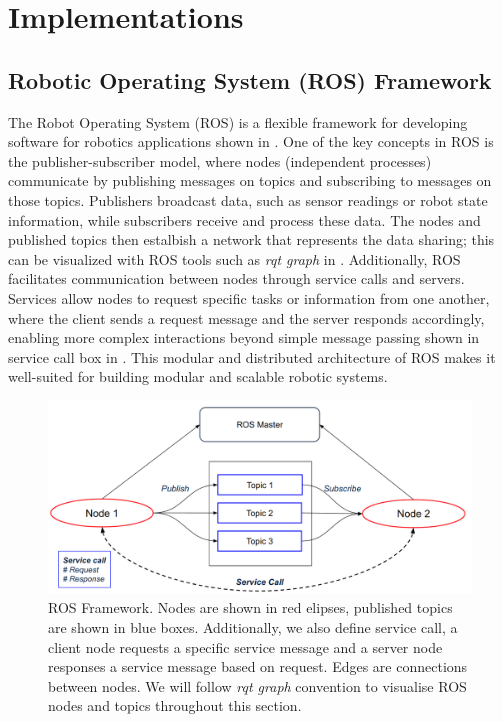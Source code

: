 \section{Implementations}
\label{sec:implementation}
\subsection{Robotic Operating System (ROS) Framework}
The Robot Operating System (ROS) is a flexible framework for developing software for robotics applications shown in . One of the key concepts in ROS is the publisher-subscriber model, where nodes (independent processes) communicate by publishing messages on topics and subscribing to messages on those topics. Publishers broadcast data, such as sensor readings or robot state information, while subscribers receive and process these data. The nodes and published topics then estalbish a network that represents the data sharing; this can be visualized with ROS tools such as \emph{rqt graph} in . Additionally, ROS facilitates communication between nodes through service calls and servers. Services allow nodes to request specific tasks or information from one another, where the client sends a request message and the server responds accordingly, enabling more complex interactions beyond simple message passing shown in service call box in . This modular and distributed architecture of ROS makes it well-suited for building modular and scalable robotic systems. 
\begin{figure}[htbp]
  \centering
  \includegraphics[width=0.8\columnwidth]{pics/Implementation_ros_framework2.png}
  \caption{ROS Framework. Nodes are shown in red elipses, published topics are shown in blue boxes. Additionally, we also define service call, a client node requests a specific service message and a server node responses a service message based on request. Edges are connections between nodes. We will follow \emph{rqt graph} convention to visualise ROS nodes and topics throughout this section.}
  \label{fig:implementation_ros}
\end{figure}

